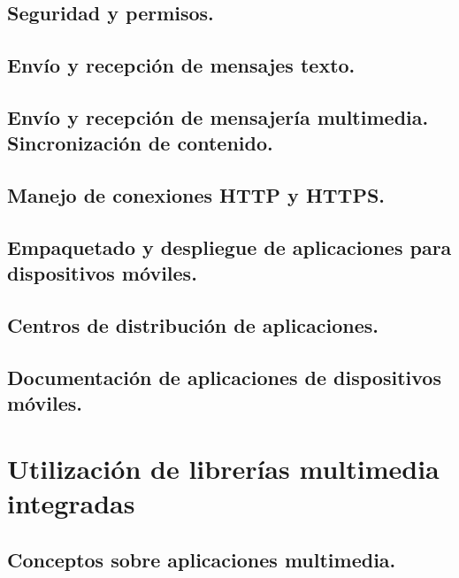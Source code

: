 \documentclass[a4paper,12pt,spanish]{sphinxmanual}
\begin{document}
\section{Seguridad y permisos.}
\label{tema2:seguridad-y-permisos}

\section{Envío y recepción de mensajes texto.}
\label{tema2:envio-y-recepcion-de-mensajes-texto}

\section{Envío y recepción de mensajería multimedia. Sincronización de contenido.}
\label{tema2:envio-y-recepcion-de-mensajeria-multimedia-sincronizacion-de-contenido}

\section{Manejo de conexiones HTTP y HTTPS.}
\label{tema2:manejo-de-conexiones-http-y-https}

\section{Empaquetado y despliegue de aplicaciones para dispositivos móviles.}
\label{tema2:empaquetado-y-despliegue-de-aplicaciones-para-dispositivos-moviles}

\section{Centros de distribución de aplicaciones.}
\label{tema2:centros-de-distribucion-de-aplicaciones}

\section{Documentación de aplicaciones de dispositivos móviles.}
\label{tema2:documentacion-de-aplicaciones-de-dispositivos-moviles}

\chapter{Utilización de librerías multimedia integradas}
\label{tema3::doc}\label{tema3:utilizacion-de-librerias-multimedia-integradas}

\section{Conceptos sobre aplicaciones multimedia.}
\label{tema3:conceptos-sobre-aplicaciones-multimedia}
\end{document}
